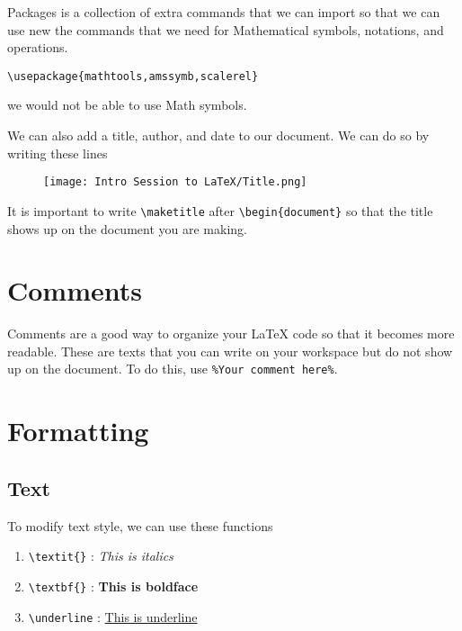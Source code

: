 \documentclass[11pt]{article}
\begin{document}
Packages is a collection of extra commands that we can import so that we can use new the commands that we need for Mathematical symbols, notations, and operations.

\vspace{0mm}
\verb|\usepackage{mathtools,amssymb,scalerel}|
\vspace{0mm}

we would not be able to use Math symbols.
\pagebreak{}

We can also add a title, author, and date to our document. We can do so by writing these lines

\vspace{3mm}
\begin{figure}[htbp]
\centerline{\texttt{[image: Intro Session to LaTeX/Title.png]}}
\end{figure}
\vspace{3mm}

It is important to write \verb|\maketitle| after \verb|\begin{document}| so that the title shows up on the document you are making.

\section{Comments}
Comments are a good way to organize your \LaTeX{} code so that it becomes more readable. These are texts that you can write on your workspace but do not show up on the document. To do this, use \verb|%Your comment here%|.

\section{Formatting}
\subsection{Text}
To modify text style, we can use these functions
\begin{enumerate}
    \item \verb|\textit{}| : \textit{This is italics}
    \item \verb|\textbf{}| : \textbf{This is boldface}
    \item \verb|\underline| : \underline{This is underline}
\end{enumerate}
\end{document}
